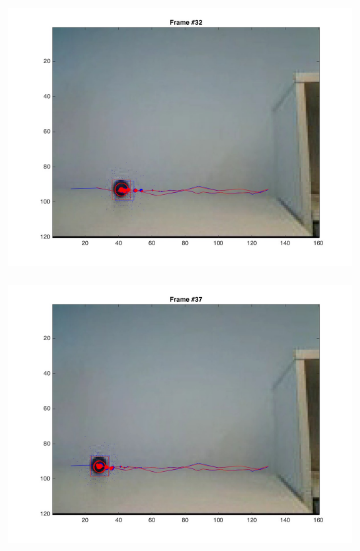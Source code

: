 \documentclass{ethz_report}
\begin{document}
\begin{figure}[h]
\begin{subfigure}[b]{.25\textwidth}
        \includegraphics[width=1\linewidth]{images/video3_noise_low_31}
    \end{subfigure}%
    \begin{subfigure}[b]{.25\textwidth}
        \centering
        \includegraphics[width=1\linewidth]{images/video3_noise_low_36}
    \end{subfigure}
    \begin{subfigure}[b]{.25\textwidth}
        \centering

\end{subfigure}
\end{figure}
\end{document}

